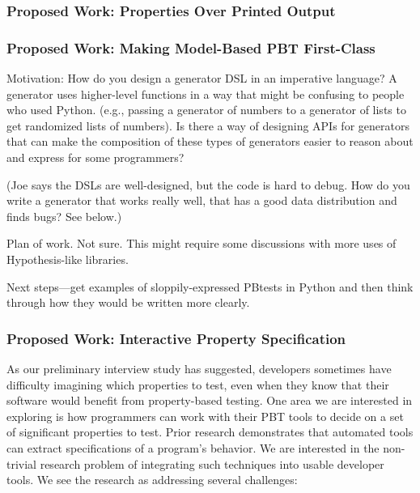 \subsubsection{Proposed Work: Properties Over Printed Output}
\subsubsection{Proposed Work: Making Model-Based PBT First-Class}

Motivation: How do you design a generator DSL in an imperative language? A
generator uses higher-level functions in a way that might be confusing to people
who used Python.  (e.g., passing a generator of numbers to a generator of lists
to get randomized lists of numbers). Is there a way of designing APIs for
generators that can make the composition of these types of generators easier to
reason about and express for some programmers?

(Joe says the DSLs are well-designed, but the code is hard to debug. How do you
write a generator that works really well, that has a good data distribution and
finds bugs? See below.)

Plan of work. Not sure. This might require some discussions with more uses of
Hypothesis-like libraries.

Next steps—get examples of sloppily-expressed PBtests in Python and then think
through how they would be written more clearly.

\subsubsection{Proposed Work: Interactive Property Specification}

 

As our preliminary interview study has suggested, developers sometimes have
difficulty imagining which properties to test, even when they know that their
software would benefit from property-based testing. One area we are interested
in exploring is how programmers can work with their PBT tools to decide on a set
of significant properties to test.  Prior research demonstrates that automated
tools can extract specifications of a program's
behavior\cite{ammons2002mining,le2018deep,claessen2010quickspec}. We are
interested in the non-trivial research problem of integrating such techniques
into usable developer tools. We see the research as addressing several
challenges:

